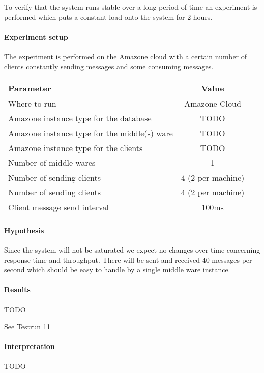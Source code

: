 \documentclass[milestone1.tex]{subfiles}
\begin{document}
To verify that the system runs stable over a long period of time an experiment is performed which puts a constant load onto the system for 2 hours.

\paragraph{Experiment setup}
The experiment is performed on the Amazone cloud with a certain number of clients constantly sending messages and some consuming messages. 

\begin{tabular}{|l|c|}
\hline 
Parameter & Value \\
\hline 
Where to run & Amazone Cloud \\ 
Amazone instance type for the database & TODO \\ 
Amazone instance type for the middle(s) ware& TODO \\ 
Amazone instance type for the clients & TODO \\ 
Number of middle wares & 1 \\ 
Number of sending clients & 4 (2 per machine) \\ 
Number of sending clients & 4 (2 per machine) \\ 
Client message send interval & 100ms \\
\hline 
\end{tabular}

\paragraph{Hypothesis}
Since the system will not be saturated we expect no changes over time concerning response time and throughput. There will be sent and received 40 messages per second which should be easy to handle by a single middle ware instance.

\paragraph{Results}

TODO

See Testrun 11


\paragraph{Interpretation}

TODO
\end{document}
